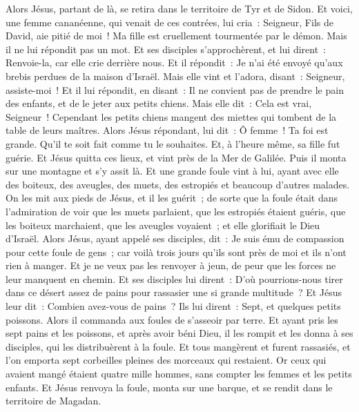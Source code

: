 \begin{multicols}{2}
Alors Jésus, partant de là, se retira dans le territoire de Tyr et de Sidon.
Et voici, une femme cananéenne, qui venait de ces contrées, lui cria~: Seigneur, Fils de David, aie pitié de moi~! Ma fille est cruellement tourmentée par le démon.
Mais il ne lui répondit pas un mot. Et ses disciples s'approchèrent, et lui dirent~: Renvoie-la, car elle crie derrière nous.
Et il répondit~: Je n'ai été envoyé qu'aux brebis perdues de la maison d'Israël.
Mais elle vint et l'adora, disant~: Seigneur, assiste-moi~!
Et il lui répondit, en disant~: Il ne convient pas de prendre le pain des enfants, et de le jeter aux petits chiens.
Mais elle dit~: Cela est vrai, Seigneur~! Cependant les petits chiens mangent des miettes qui tombent de la table de leurs maîtres.
Alors Jésus répondant, lui dit~: Ô femme~! Ta foi est grande. Qu'il te soit fait comme tu le souhaites. Et, à l'heure même, sa fille fut guérie.
Et Jésus quitta ces lieux, et vint près de la Mer de Galilée. Puis il monta sur une montagne et s'y assit là.
Et une grande foule vint à lui, ayant avec elle des boiteux, des aveugles, des muets, des estropiés et beaucoup d'autres malades. On les mit aux pieds de Jésus, et il les guérit~;
de sorte que la foule était dans l'admiration de voir que les muets parlaient, que les estropiés étaient guéris, que les boiteux marchaient, que les aveugles voyaient~; et elle glorifiait le Dieu d'Israël.
Alors Jésus, ayant appelé ses disciples, dit~: Je suis ému de compassion pour cette foule de gens~; car voilà trois jours qu'ils sont près de moi et ils n'ont rien à manger. Et je ne veux pas les renvoyer à jeun, de peur que les forces ne leur manquent en chemin.
Et ses disciples lui dirent~: D'où pourrions-nous tirer dans ce désert assez de pains pour rassasier une si grande multitude~?
Et Jésus leur dit~: Combien avez-vous de pains~? Ils lui dirent~: Sept, et quelques petits poissons.
Alors il commanda aux foules de s'asseoir par terre.
Et ayant pris les sept pains et les poissons, et après avoir béni Dieu, il les rompit et les donna à ses disciples, qui les distribuèrent à la foule.
Et tous mangèrent et furent rassasiés, et l'on emporta sept corbeilles pleines des morceaux qui restaient.
Or ceux qui avaient mangé étaient quatre mille hommes, sans compter les femmes et les petits enfants.
Et Jésus renvoya la foule, monta sur une barque, et se rendit dans le territoire de Magadan.

\end{multicols}

